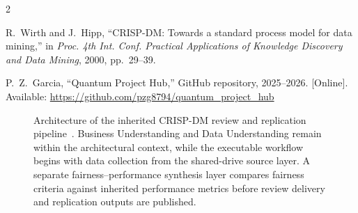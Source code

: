 \documentclass{IEEEtran}
\begin{document}
\begin{thebibliography}{2}

R.~Wirth and J.~Hipp,
``CRISP-DM: Towards a standard process model for data mining,''
in \textit{Proc. 4th Int. Conf. Practical Applications of Knowledge
Discovery and Data Mining}, 2000, pp.~29--39.

P.~Z.~Garcia,
``Quantum Project Hub,''
GitHub repository, 2025--2026.
[Online]. Available: \url{https://github.com/pzg8794/quantum_project_hub}

\end{thebibliography}

\clearpage
\begin{landscape}
\thispagestyle{plain}
\begin{figure}[p]
\centering
\resizebox{1.05\linewidth}{!}{}
\caption{Architecture of the inherited CRISP-DM review and replication pipeline~\cite{wirth2000crisp}. Business Understanding and Data Understanding remain within the architectural context, while the executable workflow begins with data collection from the shared-drive source layer. A separate fairness--performance synthesis layer compares fairness criteria against inherited performance metrics before review delivery and replication outputs are published.}
\label{fig:architecture_draft2}
\end{figure}
\end{landscape}
\end{document}
